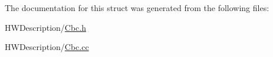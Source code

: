 The documentation for this struct was generated from the following files\-:\begin{DoxyCompactItemize}
\item 
H\-W\-Description/\hyperlink{_cbc_8h}{Cbc.\-h}\item 
H\-W\-Description/\hyperlink{_cbc_8cc}{Cbc.\-cc}\end{DoxyCompactItemize}
